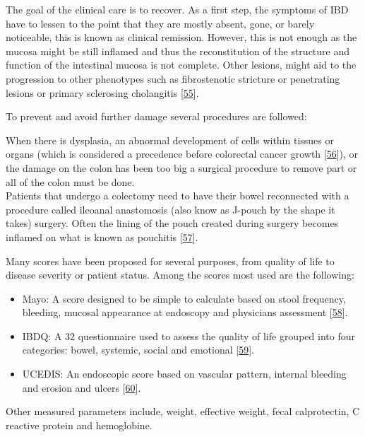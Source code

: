 \documentclass[
  12pt,
  a4paper,
  twoside,
  openright]{book}
\begin{document}
The goal of the clinical care is to recover.
As a first step, the symptoms of IBD have to lessen to the point that they are mostly absent, gone, or barely noticeable, this is known as clinical remission.
However, this is not enough as the mucosa might be still inflamed and thus the reconstitution of the structure and function of the intestinal mucosa is not complete.
Other lesions, might aid to the progression to other phenotypes such as fibrostenotic stricture or penetrating lesions or primary sclerosing cholangitis {[}\protect\hyperlink{ref-boonstra2012}{55}{]}.

To prevent and avoid further damage several procedures are followed:

When there is dysplasia, an abnormal development of cells within tissues or organs (which is considered a precedence before colorectal cancer growth {[}\protect\hyperlink{ref-mark-christensen2018}{56}{]}), or the damage on the colon has been too big a surgical procedure to remove part or all of the colon must be done.\\
Patients that undergo a colectomy need to have their bowel reconnected with a procedure called ileoanal anastomosis (also know as J-pouch by the shape it takes) surgery.
Often the lining of the pouch created during surgery becomes inflamed on what is known as pouchitis {[}\protect\hyperlink{ref-schieffer2016}{57}{]}.

Many scores have been proposed for several purposes, from quality of life to disease severity or patient status.
Among the scores most used are the following:

\begin{itemize}
\item
  Mayo: A score designed to be simple to calculate based on stool frequency, bleeding, mucosal appearance at endoscopy and physicians assessment {[}\protect\hyperlink{ref-schroeder1987}{58}{]}.
\item
  IBDQ: A 32 questionnaire used to assess the quality of life grouped into four categories: bowel, systemic, social and emotional {[}\protect\hyperlink{ref-irvine1999}{59}{]}.
\item
  UCEDIS: An endoscopic score based on vascular pattern, internal bleeding and erosion and ulcers {[}\protect\hyperlink{ref-travis2012}{60}{]}.
\end{itemize}

Other measured parameters include, weight, effective weight, fecal calprotectin, C reactive protein and hemoglobine.
\end{document}
